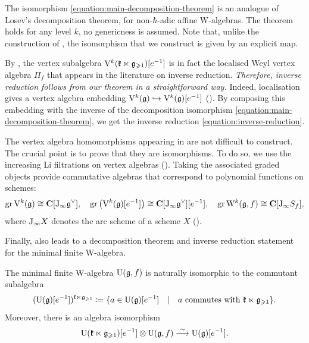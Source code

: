 The isomorphism \eqref{equation:main-decomposition-theorem} is an analogue of Losev's decomposition theorem, for non-$\hbar$-adic affine W-algebras. The theorem holds for any level $k$, no genericness is assumed. Note that, unlike the construction of \cite{butson2025inverse-affine}, the isomorphism that we construct is given by an explicit map. 

By , the vertex subalgebra $	\mathrm V^k(\mathfrak k \ltimes \mathfrak g_{\geqslant 1})[e^{-1}]$ is in fact the localised Weyl vertex algebra $\Pi_f$ that appears in the literature on inverse reduction. \emph{Therefore, inverse reduction follows from our theorem in a straightforward way.} Indeed, localisation gives a vertex algebra embedding $\mathrm V^k(\mathfrak g) \hookrightarrow \mathrm V^k(\mathfrak g)[e^{-1}]$ (). By composing this embedding with the inverse of the decomposition isomorphism \eqref{equation:main-decomposition-theorem}, we get the inverse reduction \eqref{equation:inverse-reduction}. 

The vertex algebra homomorphisms appearing in  are not difficult to construct. The crucial point is to prove that they are isomorphisms. To do so, we use the increasing Li filtrations on vertex algebras (). Taking the associated graded objects provide commutative algebras that correspond to polynomial functions on schemes:
\[ \operatorname{gr} \mathrm V^k(\mathfrak g) \cong \mathbf{C}[\mathrm{J}_\infty \mathfrak g^\vee],  \quad \operatorname{gr} \big(\mathrm V^k(\mathfrak g)[e^{-1}]\big) \cong \mathbf{C}[\mathrm{J}_\infty \mathfrak g^\vee][e^{-1}], \quad   \operatorname{gr} \mathrm W^k(\mathfrak g, f) \cong \mathbf{C}[\mathrm{J}_\infty S_f], \]
where $\mathrm{J}_\infty X$ denotes the arc scheme of a scheme $X$ ().


Finally,  also leads to a decomposition theorem and inverse reduction statement for the minimal finite W-algebra.

\begin{main} \label{main:quantum-setting}
	The minimal finite W-algebra $\mathrm U(\mathfrak g, f)$ is naturally isomorphic to the commutant subalgebra
	\[ (\mathrm U(\mathfrak g)[e^{-1}])^{\mathfrak k \ltimes \mathfrak g_{\geqslant 1}} \coloneqq \{a \in \mathrm U(\mathfrak g)[e^{-1}] \quad | \quad \text{$a$ commutes with $\mathfrak k \ltimes \mathfrak g_{\geqslant 1}$} \}. \]
	Moreover, there is an algebra isomorphism
	\begin{equation} \label{equation:main-decomposition-theorem-finite}
		\mathrm U(\mathfrak k \ltimes \mathfrak g_{\geqslant 1})[e^{-1}] \otimes \mathrm U(\mathfrak g, f) \overset{\sim}{\longrightarrow}  \mathrm U(\mathfrak g)[e^{-1}]. 
	\end{equation}
\end{main}

